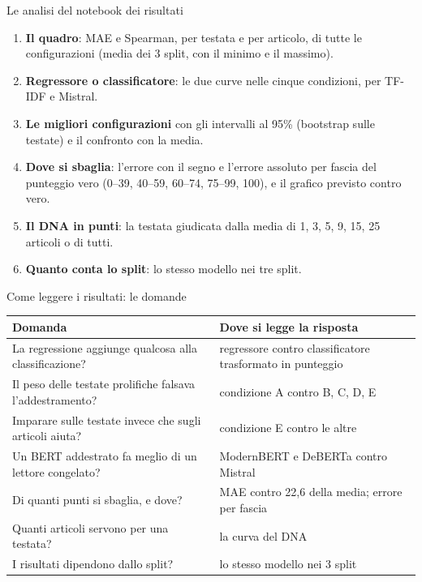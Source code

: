 \documentclass[aspectratio=169]{beamer}
\newcommand{\hl}[1]{\textbf{#1}}
\begin{document}
\begin{frame}{Le analisi del notebook dei risultati}
  \vfill
  \small
  \begin{enumerate}
    \setlength\itemsep{0.6em}
    \item \hl{Il quadro}: MAE e Spearman, per testata e per articolo, di tutte le configurazioni (media dei 3 split, con il
          minimo e il massimo).
    \item \hl{Regressore o classificatore}: le due curve nelle cinque condizioni, per TF-IDF e Mistral.
    \item \hl{Le migliori configurazioni} con gli intervalli al 95\% (bootstrap sulle testate) e il confronto con la media.
    \item \hl{Dove si sbaglia}: l'errore con il segno e l'errore assoluto per fascia del punteggio vero (0--39, 40--59,
          60--74, 75--99, 100), e il grafico previsto contro vero.
    \item \hl{Il DNA in punti}: la testata giudicata dalla media di 1, 3, 5, 9, 15, 25 articoli o di tutti.
    \item \hl{Quanto conta lo split}: lo stesso modello nei tre split.
  \end{enumerate}
  \vfill
\end{frame}

\begin{frame}{Come leggere i risultati: le domande}
  \vfill
  \small
  \begin{tabular}{>{\raggedright\arraybackslash}p{}>{\raggedright\arraybackslash}p{}}
    \toprule
    \textbf{Domanda} & \textbf{Dove si legge la risposta} \\
    \midrule
    La regressione aggiunge qualcosa alla classificazione? & regressore contro classificatore trasformato in punteggio \\
    \addlinespace
    Il peso delle testate prolifiche falsava l'addestramento? & condizione A contro B, C, D, E \\
    \addlinespace
    Imparare sulle testate invece che sugli articoli aiuta? & condizione E contro le altre \\
    \addlinespace
    Un BERT addestrato fa meglio di un lettore congelato? & ModernBERT e DeBERTa contro Mistral \\
    \addlinespace
    Di quanti punti si sbaglia, e dove? & MAE contro 22,6 della media; errore per fascia \\
    \addlinespace
    Quanti articoli servono per una testata? & la curva del DNA \\
    \addlinespace
    I risultati dipendono dallo split? & lo stesso modello nei 3 split \\
    \bottomrule
  \end{tabular}
  \vfill
\end{frame}
\end{document}
